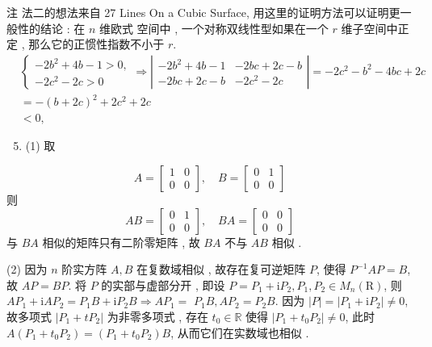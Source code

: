 \documentclass[10pt]{article}
\begin{document}
 注   法二的想法来自  27 Lines On a Cubic Surface,  用这里的证明方法可以证明更一般性的结论 :  在  $n$  维欧式   空间中 ,  一个对称双线性型如果在一个  $r$  维子空间中正定 ,  那么它的正惯性指数不小于  $r$.
$$
\begin{aligned}
& \left\{\begin{array}{l}-2 b^{2}+4 b-1>0, \\-2 c^{2}-2 c>0\end{array} \Longrightarrow\left|\begin{array}{cc}-2 b^{2}+4 b-1 & -2 b c+2 c-b \\-2 b c+2 c-b & -2 c^{2}-2 c\end{array}\right|=-2 c^{2}-b^{2}-4 b c+2 c\right. \\
& =-(b+2 c)^{2}+2 c^{2}+2 c \\
& <0 \text {, } 
\end{aligned}
$$

\begin{enumerate}
  \setcounter{enumi}{4}
  \item (1)  取 
\end{enumerate}
$$
A=\left[\begin{array}{ll}
1 & 0 \\
0 & 0
\end{array}\right], \quad B=\left[\begin{array}{ll}
0 & 1 \\
0 & 0
\end{array}\right]
$$
 则 
$$
A B=\left[\begin{array}{ll}
0 & 1 \\
0 & 0
\end{array}\right], \quad B A=\left[\begin{array}{ll}
0 & 0 \\
0 & 0
\end{array}\right]
$$
 与  $B A$  相似的矩阵只有二阶零矩阵 ,  故  $B A$  不与  $A B$  相似 .

(2)  因为  $n$  阶实方阵  $A, B$  在复数域相似 ,  故存在复可逆矩阵  $P$,  使得  $P^{-1} A P=B$,  故  $A P=B P$.  将  $P$  的实部与虚部分开 ,  即设  $P=P_{1}+\mathrm{i} P_{2}, P_{1}, P_{2} \in M_{n}(\mathrm{R})$,  则  $A P_{1}+\mathrm{i} A P_{2}=P_{1} B+\mathrm{i} P_{2} B \Longrightarrow A P_{1}=$ $P_{1} B, A P_{2}=P_{2} B$.  因为  $|P|=\left|P_{1}+\mathrm{i} P_{2}\right| \neq 0$,  故多项式  $\left|P_{1}+t P_{2}\right|$  为非零多项式 ,  存在  $t_{0} \in \mathbb{R}$  使得  $\left|P_{1}+t_{0} P_{2}\right| \neq 0$,  此时  $A\left(P_{1}+t_{0} P_{2}\right)=\left(P_{1}+t_{0} P_{2}\right) B$,  从而它们在实数域也相似 .
\end{document}
